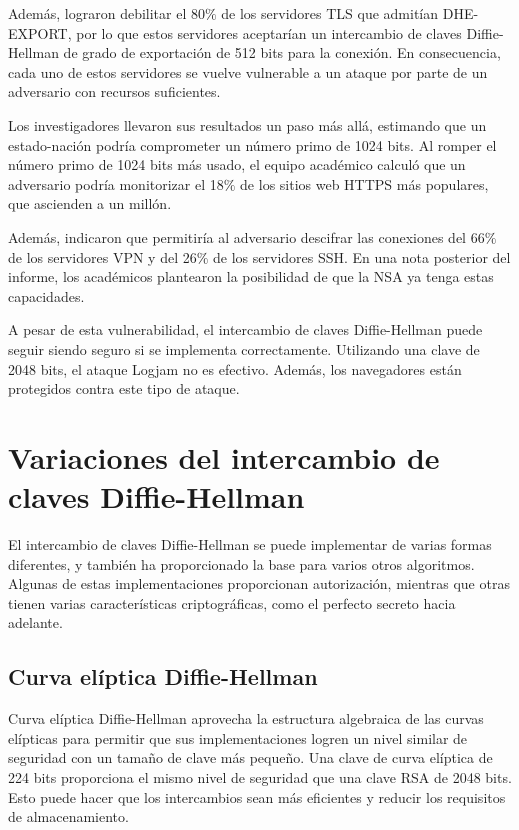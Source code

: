 \documentclass[11pt]{article}
\begin{document}
Además, lograron debilitar el 80$\%$ de los servidores TLS que admitían DHE-EXPORT, por lo que estos servidores aceptarían un intercambio de claves Diffie-Hellman de grado de exportación de 512 bits para la conexión. En consecuencia, cada uno de estos servidores se vuelve vulnerable a un ataque por parte de un adversario con recursos suficientes.

Los investigadores llevaron sus resultados un paso más allá, estimando que un estado-nación podría comprometer un número primo de 1024 bits. Al romper el número primo de 1024 bits más usado, el equipo académico calculó que un adversario podría monitorizar el 18$\%$ de los sitios web HTTPS más populares, que ascienden a un millón.

Además, indicaron que permitiría al adversario descifrar las conexiones del 66$\%$ de los servidores VPN y del 26$\%$ de los servidores SSH. En una nota posterior del informe, los académicos plantearon la posibilidad de que la NSA ya tenga estas capacidades.

A pesar de esta vulnerabilidad, el intercambio de claves Diffie-Hellman puede seguir siendo seguro si se implementa correctamente. Utilizando una clave de 2048 bits, el ataque Logjam no es efectivo. Además, los navegadores están protegidos contra este tipo de ataque.

\section{Variaciones del intercambio de claves Diffie-Hellman}

El intercambio de claves Diffie-Hellman se puede implementar de varias formas diferentes, y también ha proporcionado la base para varios otros algoritmos. Algunas de estas implementaciones proporcionan autorización, mientras que otras tienen varias características criptográficas, como el perfecto secreto hacia adelante.

\subsection{Curva elíptica Diffie-Hellman}
Curva elíptica Diffie-Hellman aprovecha la estructura algebraica de las curvas elípticas para permitir que sus implementaciones logren un nivel similar de seguridad con un tamaño de clave más pequeño. Una clave de curva elíptica de 224 bits proporciona el mismo nivel de seguridad que una clave RSA de 2048 bits. Esto puede hacer que los intercambios sean más eficientes y reducir los requisitos de almacenamiento.
\end{document}
